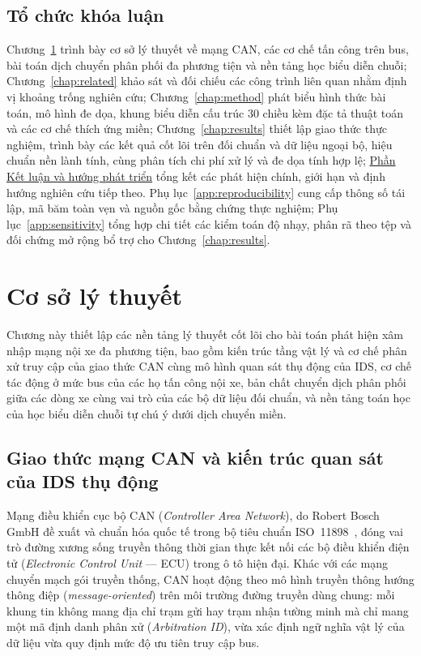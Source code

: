 \documentclass[12pt, a4paper, reqno, oneside]{book}
\newcommand\sect[1]{%
  \Needspace{5\baselineskip}%
  \phantomsection%
  \addcontentsline{toc}{section}{#1}%
  \section*{#1}%
}
\begin{document}
\sect{Tổ chức khóa luận}
Chương~\ref{chap:background} trình bày cơ sở lý thuyết về mạng CAN, các cơ chế tấn công trên bus, bài toán dịch chuyển phân phối đa phương tiện và nền tảng học biểu diễn chuỗi; Chương~\ref{chap:related} khảo sát và đối chiếu các công trình liên quan nhằm định vị khoảng trống nghiên cứu; Chương~\ref{chap:method} phát biểu hình thức bài toán, mô hình đe dọa, khung biểu diễn cấu trúc 30 chiều kèm đặc tả thuật toán và các cơ chế thích ứng miền; Chương~\ref{chap:results} thiết lập giao thức thực nghiệm, trình bày các kết quả cốt lõi trên đối chuẩn và dữ liệu ngoại bộ, hiệu chuẩn nền lành tính, cùng phân tích chi phí xử lý và đe dọa tính hợp lệ; \hyperref[chap:conclusion]{Phần Kết luận và hướng phát triển} tổng kết các phát hiện chính, giới hạn và định hướng nghiên cứu tiếp theo. Phụ lục~\ref{app:reproducibility} cung cấp thông số tái lập, mã băm toàn vẹn và nguồn gốc bằng chứng thực nghiệm; Phụ lục~\ref{app:sensitivity} tổng hợp chi tiết các kiểm toán độ nhạy, phân rã theo tệp và đối chứng mở rộng bổ trợ cho Chương~\ref{chap:results}.

\chapter{Cơ sở lý thuyết}\label{chap:background}
Chương này thiết lập các nền tảng lý thuyết cốt lõi cho bài toán phát hiện xâm nhập mạng nội xe đa phương tiện, bao gồm kiến trúc tầng vật lý và cơ chế phân xử truy cập của giao thức CAN cùng mô hình quan sát thụ động của IDS, cơ chế tác động ở mức bus của các họ tấn công nội xe, bản chất chuyển dịch phân phối giữa các dòng xe cùng vai trò của các bộ dữ liệu đối chuẩn, và nền tảng toán học của học biểu diễn chuỗi tự chú ý dưới dịch chuyển miền.

\section{Giao thức mạng CAN và kiến trúc quan sát của IDS thụ động}
Mạng điều khiển cục bộ CAN (\textit{Controller Area Network}), do Robert Bosch GmbH đề xuất và chuẩn hóa quốc tế trong bộ tiêu chuẩn ISO~11898~\cite{bosch1991can,iso11898_1_2015,iso11898_2_2016}, đóng vai trò đường xương sống truyền thông thời gian thực kết nối các bộ điều khiển điện tử (\textit{Electronic Control Unit} --- ECU) trong ô tô hiện đại. Khác với các mạng chuyển mạch gói truyền thống, CAN hoạt động theo mô hình truyền thông hướng thông điệp (\textit{message-oriented}) trên môi trường đường truyền dùng chung: mỗi khung tin không mang địa chỉ trạm gửi hay trạm nhận tường minh mà chỉ mang một mã định danh phân xử (\textit{Arbitration ID}), vừa xác định ngữ nghĩa vật lý của dữ liệu vừa quy định mức độ ưu tiên truy cập bus.
\end{document}

